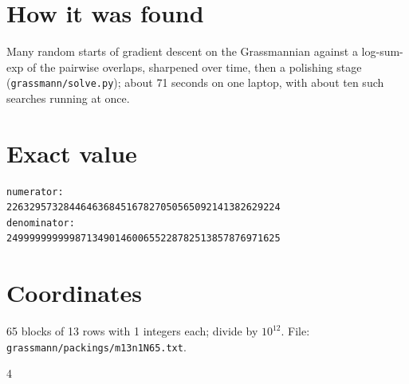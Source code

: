 \documentclass[11pt,a4paper]{article}
\begin{document}
\section{How it was found}
Many random starts of gradient descent on the Grassmannian against a log-sum-exp of the pairwise overlaps, sharpened over time, then a polishing stage (\texttt{grassmann/solve.py}); about 71 seconds on one laptop, with about ten such searches running at once.


\appendix
\section{Exact value}
{\small
\begin{verbatim}
numerator:
226329573284464636845167827050565092141382629224
denominator:
249999999999871349014600655228782513857876971625
\end{verbatim}}

\section{Coordinates}
65 blocks of 13 rows with 1 integers each; divide by $10^{12}$. File: \texttt{grassmann/packings/m13n1N65.txt}.
{\tiny
\begin{multicols}{4}
\end{multicols}}
\end{document}
